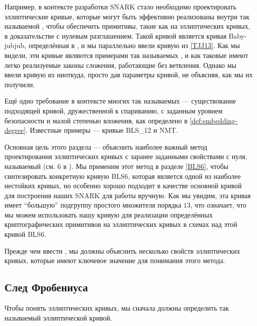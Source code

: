 Например, в контексте разработки SNARK стало необходимо проектировать эллиптические кривые, которые могут быть эффективно реализованы внутри так называемой , чтобы обеспечить примитивы, такие как  на эллиптических кривых, в доказательстве с нулевым разглашением. Такой кривой является кривая Baby-jubjub, определённая в \cite{whitehat-21}, и мы параллельно ввели кривую  из \examplename{} \ref{TJJ13}. Как мы видели, эти кривые являются примерами так называемых , и как таковые имеют легко реализуемые законы сложения, работающие без ветвления. Однако мы ввели кривую  из ниоткуда, просто дав параметры кривой, не объясняя, как мы их получили.

Ещё одно требование в контексте многих так называемых  — существование подходящей кривой, дружественной к спариванию, с заданным уровнем безопасности и малой степенью вложения, как определено в \ref{def:embedding-degree}. Известные примеры — кривые BLS\_12 и NMT.

Основная цель этого раздела — объяснить наиболее важный метод проектирования эллиптических кривых с заранее заданными свойствами с нуля, называемый  (см. \chaptname{} 6 в \cite{silverman-1994}). Мы применим этот метод в разделе \ref{BLS6}, чтобы синтезировать конкретную кривую BLS6, которая является одной из наиболее нестойких кривых, но особенно хорошо подходит в качестве основной кривой для построения наших SNARK для работы вручную. Как мы увидим, эта кривая имеет ``большую'' подгруппу простого множителя порядка $13$, что означает, что мы можем использовать нашу кривую  для реализации определённых криптографических примитивов на эллиптических кривых в схемах над этой кривой BLS6. 
 
Прежде чем ввести , мы должны объяснить несколько свойств эллиптических кривых, которые имеют ключевое значение для понимания этого метода. 

\subsection{След Фробениуса} Чтобы понять  эллиптических кривых, мы сначала должны определить так называемый  эллиптической кривой.

